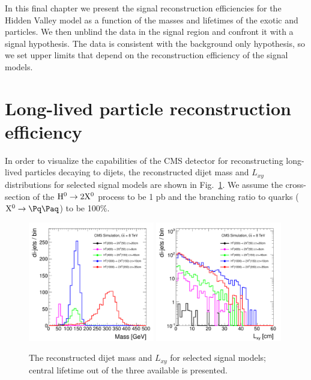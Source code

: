 In this final chapter we present the signal reconstruction efficiencies for the
 Hidden Valley model
as a function of the masses and lifetimes of the exotic \Higgs and \X particles. 
We then unblind the data in the signal region and confront it with a
 signal hypothesis. The data is consistent with the background only hypothesis, so we
set upper limits that depend on the reconstruction efficiency of the signal models.

\section{Long-lived particle reconstruction efficiency}
\label{sec:signalefficiency}

In order to visualize the capabilities of the CMS detector for reconstructing long-lived particles decaying to 
dijets, 
the reconstructed dijet mass and $L_{xy}$ distributions for selected signal models are shown in Fig.~\ref{fig:signal}.
We assume the cross-section of the $\mathrm{H}^{0} \to 2\mathrm{X^{0}}$ process to be 1 pb and the branching 
ratio to quarks ($\X \to \qq$) to be 100\%.

\begin{figure}[htbp]
\centering
\includegraphics[width=0.49\textwidth]{plots/signal/mass.pdf}
\includegraphics[width=0.49\textwidth]{plots/signal/Lxy.pdf}
\caption{The reconstructed dijet mass and $L_{xy}$ for selected signal models; central lifetime out of the three available is presented.\label{fig:signal}}
\end{figure}

